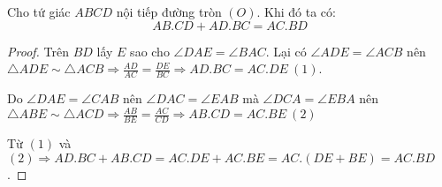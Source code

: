 \begin{theorem}[Ptolemy]
	Cho tứ giác $ABCD$ nội tiếp đường tròn $(O)$. Khi đó ta có: 
	\[
		AB.CD + AD.BC = AC.BD
	\]
	\begin{center}	
		
	\end{center}

	\begin{proof}

		Trên $BD$ lấy $E$ sao cho $\angle DAE = \angle BAC$. Lại có $\angle ADE = \angle ACB$ nên $\triangle ADE \sim \triangle ACB \Rightarrow \frac{AD}{AC} = \frac{DE}{BC} \Rightarrow AD.BC = AC.DE \ (1)$.

		Do $\angle DAE = \angle CAB$ nên $\angle DAC = \angle EAB$ mà $\angle DCA = \angle EBA$ nên $\triangle ABE \sim \triangle ACD \Rightarrow \frac{AB}{BE} = \frac{AC}{CD} \Rightarrow AB.CD = AC.BE \ (2)$

		Từ $(1)$ và $(2) \Rightarrow AD.BC + AB.CD = AC.DE + AC.BE = AC.(DE + BE) = AC.BD$. 
	\end{proof}
\end{theorem}